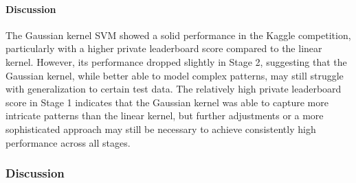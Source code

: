 \documentclass[10pt,a4paper]{article}
\begin{document}
\paragraph{Discussion}
The Gaussian kernel SVM showed a solid performance in the Kaggle competition, particularly with a higher private leaderboard score compared to the linear kernel. However, its performance dropped slightly in Stage 2, suggesting that the Gaussian kernel, while better able to model complex patterns, may still struggle with generalization to certain test data. The relatively high private leaderboard score in Stage 1 indicates that the Gaussian kernel was able to capture more intricate patterns than the linear kernel, but further adjustments or a more sophisticated approach may still be necessary to achieve consistently high performance across all stages.



\subsubsection{Discussion}
\end{document}
